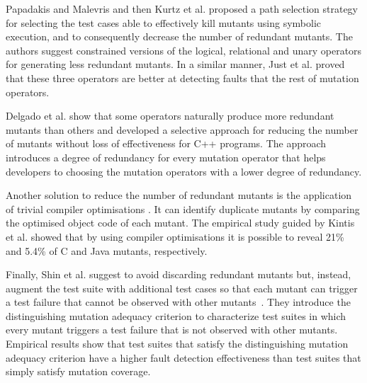 Papadakis and Malevris \cite{papadakis2012mutation} and then Kurtz et al. \cite{kurtz2015static} proposed a path selection strategy for selecting the test cases able to effectively kill mutants using symbolic execution, and to consequently decrease the number of redundant mutants. 
The authors suggest constrained versions of the logical, relational and unary operators for generating less redundant mutants. 
In a similar manner, Just et al. \cite{just2012redundant,just2015higher} proved that these three operators are better at detecting faults that the rest of mutation operators.

Delgado et al. \cite{delgado2017assessment} show that some operators naturally produce more redundant mutants than others and
developed a selective approach for reducing the number of mutants without loss of effectiveness for C++ programs. 
The approach introduces a degree of redundancy for every mutation operator that helps developers to choosing the mutation operators with a lower degree of redundancy.

Another solution to reduce the number of redundant mutants is the application of trivial compiler optimisations \cite{papadakis2015trivial, kintis2017detecting,papadakis2019mutation}. 
It can identify duplicate mutants by comparing the optimised object code of each mutant. The empirical study guided by Kintis et al. \cite{kintis2017detecting} showed that by using compiler optimisations it is possible to reveal 21\% and 5.4\% of C and Java mutants, respectively.


Finally, Shin et al. suggest to avoid discarding redundant mutants but, instead, augment the test suite with additional test cases so that 
each mutant can trigger a test failure that cannot be observed with other mutants~\cite{Shin:TSE:DCriterion:2018}. 
They introduce the distinguishing mutation adequacy criterion to characterize test suites in which every mutant triggers a test failure that is not observed with other mutants.
Empirical results show that test suites that satisfy the distinguishing mutation adequacy criterion have a higher
 fault detection effectiveness than test suites that simply satisfy mutation coverage.



